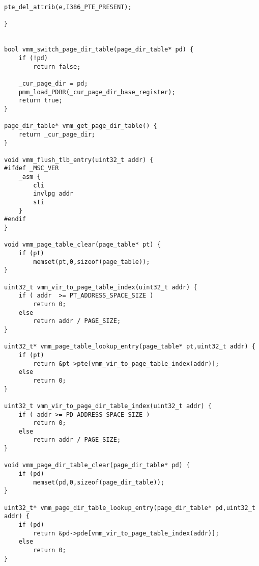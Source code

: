 \documentclass[document.tex]{subfiles}
\begin{document}
\begin{english}
\begin{lstlisting}[label=lst:vmm.cpp,caption=\en{Virtual Memory Manager Implemetation}]
	pte_del_attrib(e,I386_PTE_PRESENT);
	
}


bool vmm_switch_page_dir_table(page_dir_table* pd) {
	if (!pd)
		return false;
	
	_cur_page_dir = pd;
	pmm_load_PDBR(_cur_page_dir_base_register);
	return true;
}

page_dir_table* vmm_get_page_dir_table() {
	return _cur_page_dir;
}

void vmm_flush_tlb_entry(uint32_t addr) {
#ifdef _MSC_VER
	_asm {
		cli
		invlpg addr
		sti
	}
#endif
}

void vmm_page_table_clear(page_table* pt) {
	if (pt)
		memset(pt,0,sizeof(page_table));
}

uint32_t vmm_vir_to_page_table_index(uint32_t addr) {
	if ( addr  >= PT_ADDRESS_SPACE_SIZE )
		return 0;
	else
		return addr / PAGE_SIZE;
}

uint32_t* vmm_page_table_lookup_entry(page_table* pt,uint32_t addr) {
	if (pt)
		return &pt->pte[vmm_vir_to_page_table_index(addr)];
	else
		return 0;
}

uint32_t vmm_vir_to_page_dir_table_index(uint32_t addr) {
	if ( addr >= PD_ADDRESS_SPACE_SIZE )
		return 0;
	else
		return addr / PAGE_SIZE;
}

void vmm_page_dir_table_clear(page_dir_table* pd) {
	if (pd)
		memset(pd,0,sizeof(page_dir_table));
}

uint32_t* vmm_page_dir_table_lookup_entry(page_dir_table* pd,uint32_t addr) {
	if (pd)
		return &pd->pde[vmm_vir_to_page_table_index(addr)];
	else 
		return 0;
}


\end{lstlisting}
\end{english}
\end{document}
